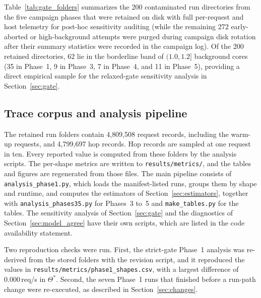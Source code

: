 Table~\ref{tab:gate_folders} summarizes the 200 contaminated run directories from the five campaign phases that were retained on disk with full per-request and host telemetry for post-hoc sensitivity auditing (while the remaining 272 early-aborted or high-background attempts were purged during campaign disk rotation after their summary statistics were recorded in the campaign log). Of the 200 retained directories, 62 lie in the borderline band of $(1.0, 1.2]$ background cores (35 in Phase~1, 9 in Phase~3, 7 in Phase~4, and 11 in Phase~5), providing a direct empirical sample for the relaxed-gate sensitivity analysis in Section~\ref{sec:gate}.



\subsection{Trace corpus and analysis pipeline}

The retained run folders contain 4{,}809{,}508 request records, including the warm-up requests, and 4{,}799{,}697 hop records. Hop records are sampled at one request in ten. Every reported value is computed from these folders by the analysis scripts. The per-shape metrics are written to \texttt{results/metrics/}, and the tables and figures are regenerated from those files. The main pipeline consists of \texttt{analysis\_phase1.py}, which loads the manifest-listed runs, groups them by shape and runtime, and computes the estimators of Section~\ref{sec:estimators}, together with \texttt{analysis\_phases35.py} for Phases~3 to~5 and \texttt{make\_tables.py} for the tables. The sensitivity analysis of Section~\ref{sec:gate} and the diagnostics of Section~\ref{sec:model_agree} have their own scripts, which are listed in the code availability statement.

Two reproduction checks were run. First, the strict-gate Phase~1 analysis was re-derived from the stored folders with the revision script, and it reproduced the values in \texttt{results/metrics/phase1\_shapes.csv}, with a largest difference of 0.000\,req/s in $\Theta^*$. Second, the seven Phase~1 runs that finished before a run-path change were re-executed, as described in Section~\ref{sec:changes}.

